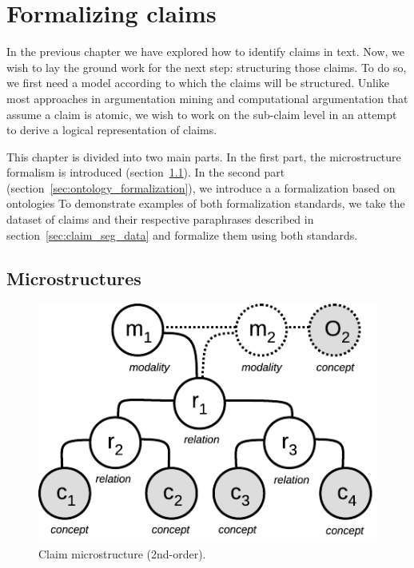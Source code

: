 \chapter{Formalizing claims}
\label{chap:formalization}

In the previous chapter we have explored how to identify claims in text. 
Now, we wish to lay the ground work for the next step: structuring those claims. 
To do so, we first need a model according to which the claims will be structured. 
Unlike most approaches in argumentation mining and computational argumentation that
assume a claim is atomic, we wish to work on the sub-claim level in an attempt to 
derive a logical representation of claims. 

This chapter is divided into two main parts.  In the first part, the
microstructure formalism is introduced (section~\ref{sec:for_microstructures}).
In the second part (section~\ref{sec:ontology_formalization}), we introduce a a
formalization based on ontologies To demonstrate examples of both formalization
standards, we take the dataset of claims and their respective paraphrases
described in section~\ref{sec:claim_seg_data} and formalize them using both
standards. 

\section{Microstructures}
\label{sec:for_microstructures}

\begin{figure}
	\begin{center}
      \includegraphics[scale=1]{microstructure.pdf}
      \end{center}
      \caption{Claim microstructure (2nd-order).}
  \label{fig:structures_flowchart}
\end{figure}

